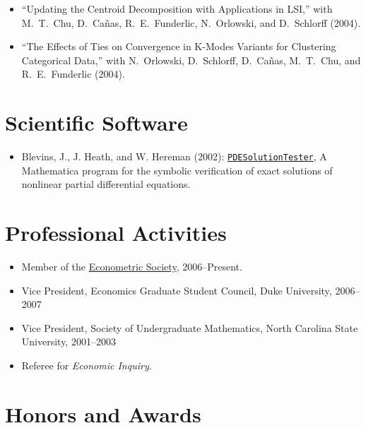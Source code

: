 \documentclass[overlapped,line,letterpaper]{res}
\begin{document}
\begin{resume}
\begin{itemize}
\item ``Updating the Centroid Decomposition with Applications in LSI,''
  with M.\ T.\ Chu, D.\ Ca\~{n}as, R.\ E.\ Funderlic, N.\ Orlowski, and
  D.\ Schlorff (2004).
\item ``The Effects of Ties on Convergence in K-Modes Variants for
  Clustering Categorical Data,'' with N.\ Orlowski, D.\ Schlorff, D.\
  Ca\~{n}as, M.\ T.\ Chu, and R.\ E.\ Funderlic (2004).
\end{itemize}

\section{\bf Scientific Software}

\begin{itemize}
\item Blevins, J., J. Heath, and W. Hereman (2002):
  \href{http://www.mines.edu/fs_home/whereman/software/PDESolutionTester/}
  {\texttt{PDESolutionTester}}, A Mathematica program for the symbolic
  verification of exact solutions of nonlinear partial differential
  equations.
\end{itemize}

\section{\bf Professional Activities}

\begin{itemize}
\item Member of the
  \href{http://www.econometricsociety.org/}{Econometric Society},
  2006--Present.
\item Vice President, Economics Graduate Student Council,
  Duke University, 2006--2007
\item Vice President, Society of Undergraduate Mathematics,
  North Carolina State University, 2001--2003
\item Referee for {\em Economic Inquiry}.
\end{itemize}

\section{\bf Honors and Awards}


\end{resume}
\end{document}

